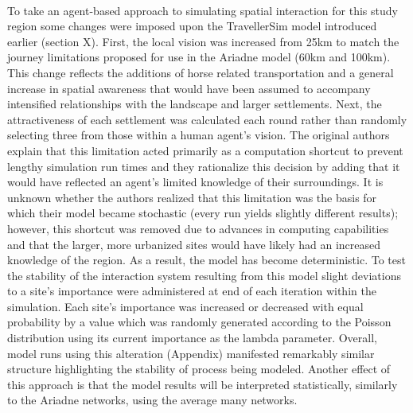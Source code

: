 \documentclass[12pt,a4paper]{thesis}
\begin{document}
\paragraph{}
To take an agent-based approach to simulating spatial interaction for this study region some changes were imposed upon the TravellerSim model introduced earlier (section X). First, the local vision was increased from 25km to match the journey limitations proposed for use in the Ariadne model (60km and 100km). This change reflects the additions of horse related transportation and a general increase in spatial awareness that would have been assumed to accompany intensified relationships with the landscape and larger settlements. Next, the attractiveness of each settlement was calculated each round rather than randomly selecting three from those within a human agent's vision. The original authors \citep{GraSte08} explain that this limitation acted primarily as a computation shortcut to prevent lengthy simulation run times and they rationalize this decision by adding that it would have reflected an agent's limited knowledge of their surroundings. It is unknown whether the authors realized that this limitation was the basis for which their model became stochastic (every run yields slightly different results); however, this shortcut was removed due to advances in computing capabilities and that the larger, more urbanized sites would have likely had an increased knowledge of the region. As a result, the model has become deterministic. To test the stability of the interaction system resulting from this model slight deviations to a site's importance were administered at end of each iteration within the simulation. Each site's importance was increased or decreased with equal probability by a value which was randomly generated according to the Poisson distribution using its current importance as the lambda parameter. Overall, model runs using this alteration (Appendix) manifested remarkably similar structure highlighting the stability of process being modeled. Another effect of this approach is that the model results will be interpreted statistically, similarly to the Ariadne networks, using the average many networks.  
\end{document}
